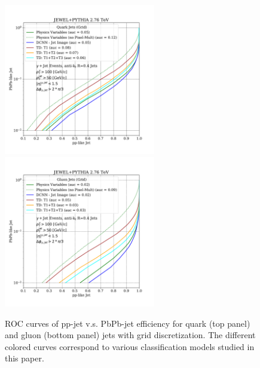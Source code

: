 \documentclass[notoc]{JHEP3}
\begin{document}
\begin{figure}[t]
	   \centering
	   \includegraphics[width=0.59\textwidth]{plots/JEWELPYTHIA_2p76TeV_quark_ppvspbpb.pdf}
	   \includegraphics[width=0.59\textwidth]{plots/JEWELPYTHIA_2p76TeV_gluon_ppvspbpb.pdf}
	   \caption{ROC curves of pp-jet v.s. PbPb-jet efficiency for quark (top panel) and gluon (bottom panel) jets with grid discretization. The different colored curves correspond to various classification models studied in this paper.}
\label{fig:ROC_qq_gg}
\end{figure}
\end{document}
